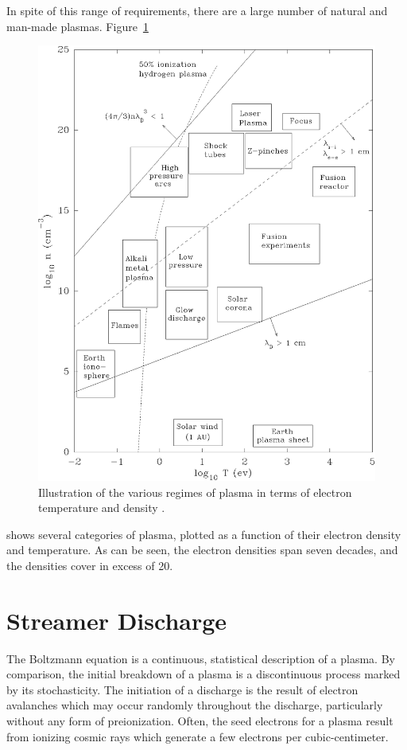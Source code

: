{In spite of this range of requirements, there are a large number of natural and
man-made plasmas. Figure~\ref{fig:regimes}
\begin{figure}
  \centering
  \includegraphics{./chapters/theory/figures/regimes.eps}
  \caption{Illustration of the various regimes of plasma in terms of
electron temperature and density \cite{Huba2011}.}
  \label{fig:regimes}
\end{figure}
shows several categories of plasma, plotted as a function of their electron
density and temperature. As can be seen, the electron densities span seven
decades, and the densities cover in excess of 20.

\section{Streamer Discharge}
The Boltzmann equation is a continuous, statistical description of a plasma. By
comparison, the initial breakdown of a plasma is a discontinuous process marked
by its stochasticity. The initiation of a discharge is the result of electron
avalanches which may occur randomly throughout the discharge, particularly
without any form of preionization. Often, the seed electrons for a plasma result
from ionizing cosmic rays which generate a few electrons per cubic-centimeter.

}
